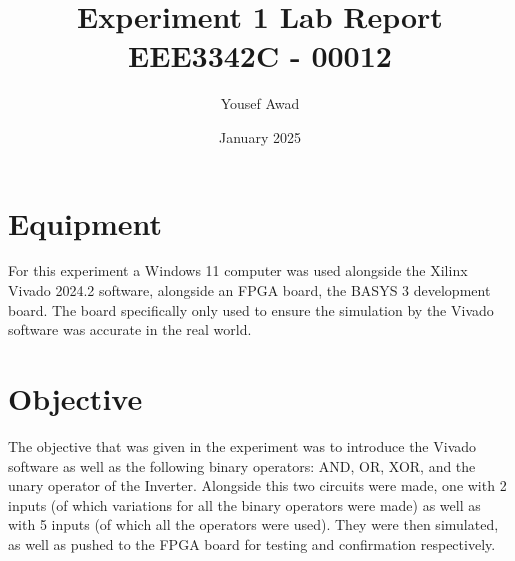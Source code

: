 \documentclass{article}
\title{Experiment 1 Lab Report \\ \large EEE3342C - 00012}
\author{Yousef Awad}
\date{January 2025}
\begin{document}
\maketitle
\tableofcontents
\newpage

\section{Equipment}
\qquad
For this experiment a Windows 11 computer was used alongside the Xilinx Vivado 2024.2 software, alongside an FPGA board, the BASYS 3 development board. The board specifically only used to ensure the simulation by the Vivado software was accurate in the real world.\\
\section{Objective}
\qquad
The objective that was given in the experiment was to introduce the Vivado software as well as the following binary operators: AND, OR, XOR, and the unary operator of the Inverter. Alongside this two circuits were made, one with 2 inputs (of which variations for all the binary operators were made) as well as with 5 inputs (of which all the operators were used). They were then simulated, as well as pushed to the FPGA board for testing and confirmation respectively.\\
\end{document}
